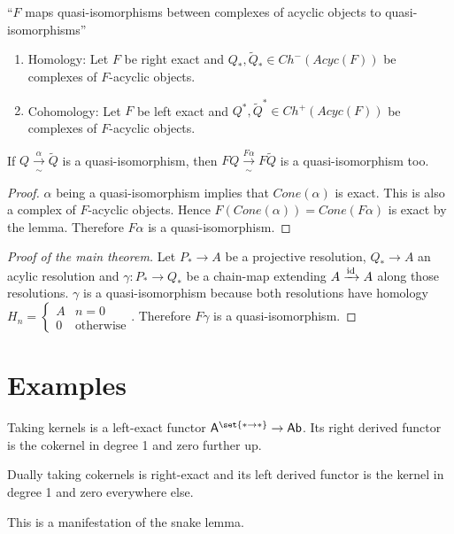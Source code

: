 \documentclass[fontsize=11pt,fleqn,a4paper]{scrartcl}
\begin{document}
\begin{corollary}
\enquote{$F$ maps quasi-isomorphisms between complexes of acyclic objects to quasi-isomorphisms}
\begin{multicols}{2}
\begin{enumerate}
\item Homology: Let $F$ be right exact and $Q_\ast,\widetilde{Q}_\ast\in Ch^-(Acyc(F))$ be complexes of $F$-acyclic objects.
\item Cohomology: Let $F$ be left exact and $Q^\ast,\widetilde{Q}^\ast\in Ch^+(Acyc(F))$ be complexes of $F$-acyclic objects.
\end{enumerate}
\end{multicols}
If $Q \xrightarrow[\sim]{\alpha} \tilde{Q}$ is a quasi-isomorphism, then $FQ \xrightarrow[\sim]{F\alpha} F\tilde{Q}$ is a quasi-isomorphism too.
\end{corollary}
\begin{proof}
$\alpha$ being a quasi-isomorphism implies that $Cone(\alpha)$ is exact. This is also a complex of $F$-acyclic objects. Hence $F(Cone(\alpha)) = Cone(F\alpha)$ is exact by the lemma. Therefore $F\alpha$ is a quasi-isomorphism.
\end{proof}

\begin{proof}[Proof of the main theorem]
Let $P_\ast \to A$ be a projective resolution, $Q_\ast \to A$ an acylic resolution and $\gamma: P_\ast\to Q_\ast$ be a chain-map extending $A\xrightarrow{\operatorname{id}} A$ along those resolutions. $\gamma$ is a quasi-isomorphism because both resolutions have homology $H_n = \begin{cases} A & n=0 \\ 0 & \text{otherwise}\end{cases}$. Therefore $F\gamma$ is a quasi-isomorphism.
\end{proof}

\section{Examples}

\begin{example}
Taking kernels is a left-exact functor $\mathsf{A}^{\set{\ast\to\ast}} \to \mathsf{Ab}$. Its right derived functor is the cokernel in degree 1 and zero further up.

Dually taking cokernels is right-exact and its left derived functor is the kernel in degree 1 and zero everywhere else.

This is a manifestation of the snake lemma.
\end{example}
\end{document}
